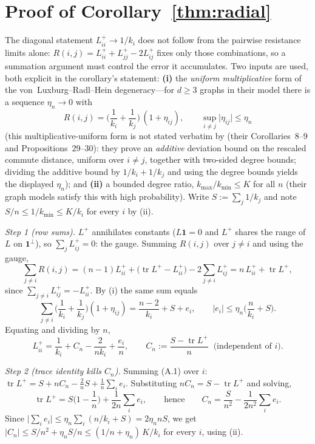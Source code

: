\documentclass[11pt]{article}
\theoremstyle{remark}
\begin{document}
\appendix
\section{Proof of Corollary~\ref{thm:radial}}\label{app:radial}

The diagonal statement $L^+_{ii}\to1/k_i$ does not follow from the pairwise
resistance limits alone:
$R(i,j)=L^+_{ii}+L^+_{jj}-2L^+_{ij}$ fixes only those combinations, so a
summation argument must control the error it accumulates. Two inputs are used,
both explicit in the corollary's statement: \textbf{(i)} the \emph{uniform
multiplicative} form of the
von~Luxburg--Radl--Hein degeneracy---for $d\ge3$ graphs in their model there is
a sequence $\eta_n\to0$ with
\[
R(i,j)=\Big(\frac1{k_i}+\frac1{k_j}\Big)\,(1+\eta_{ij}),\qquad
\sup_{i\ne j}\lvert\eta_{ij}\rvert\le\eta_n
\]
(this multiplicative-uniform form is not stated verbatim by \cite{vonluxburg2014}
(their Corollaries~8--9 and Propositions~29--30):
they prove an \emph{additive} deviation bound on the rescaled commute distance,
uniform over $i\ne j$, together with two-sided degree bounds; dividing the
additive bound by $1/k_i+1/k_j$ and using the degree bounds yields the displayed
$\eta_n$); and \textbf{(ii)} a bounded degree ratio,
$k_{\max}/k_{\min}\le K$ for all $n$ (their graph models satisfy this with high
probability). Write $S:=\sum_j 1/k_j$ and note $S/n\le1/k_{\min}\le K/k_i$ for
every $i$ by (ii).

\emph{Step 1 (row sums).} $L^+$ annihilates constants ($L\mathbf1=0$ and
$L^+$ shares the range of $L$ on $\mathbf1^\perp$), so $\sum_j L^+_{ij}=0$: the
gauge. Summing $R(i,j)$ over $j\ne i$ and using the gauge,
\[
\sum_{j\ne i}R(i,j)
=(n-1)L^+_{ii}+\big(\operatorname{tr}L^+-L^+_{ii}\big)
-2\sum_{j\ne i}L^+_{ij}
=n\,L^+_{ii}+\operatorname{tr}L^+,
\]
since $\sum_{j\ne i}L^+_{ij}=-L^+_{ii}$. By (i) the same sum equals
\[
\sum_{j\ne i}\Big(\frac1{k_i}+\frac1{k_j}\Big)(1+\eta_{ij})
=\frac{n-2}{k_i}+S+e_i,
\qquad
\lvert e_i\rvert\le\eta_n\Big(\frac{n}{k_i}+S\Big).
\]
Equating and dividing by $n$,
\begin{equation}
L^{+}_{ii}=\frac1{k_i}+C_n-\frac{2}{n k_i}+\frac{e_i}{n},
\qquad
C_n:=\frac{S-\operatorname{tr}L^+}{n}\ \text{ (independent of $i$)} .
\tag{A.1}
\end{equation}

\emph{Step 2 (trace identity kills $C_n$).} Summing (A.1) over $i$:
$\operatorname{tr}L^+=S+nC_n-\tfrac2nS+\tfrac1n\sum_i e_i$. Substituting
$nC_n=S-\operatorname{tr}L^+$ and solving,
\[
\operatorname{tr}L^+=S\Big(1-\frac1n\Big)+\frac{1}{2n}\sum_i e_i,
\qquad\text{hence}\qquad
C_n=\frac{S}{n^2}-\frac{1}{2n^2}\sum_i e_i .
\]
Since $\lvert\sum_i e_i\rvert\le\eta_n\sum_i(n/k_i+S)=2\eta_n nS$, we get
$\lvert C_n\rvert\le S/n^2+\eta_n S/n\le(1/n+\eta_n)\,K/k_i$ for every $i$,
using (ii).
\end{document}
